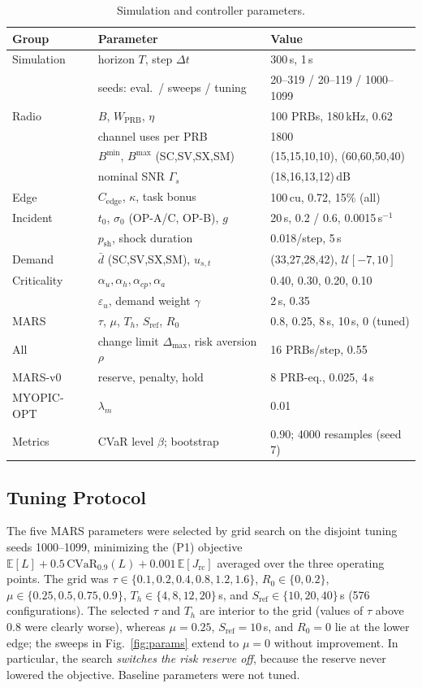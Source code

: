 \documentclass[conference]{IEEEtran}
\newcommand{\figref}[1]{Fig.~\ref{#1}}
\begin{document}
\begin{table}[t]
\centering
\caption{Simulation and controller parameters.}
\label{tab:params}
\scriptsize
\setlength{\tabcolsep}{2.5pt}
\begin{tabular}{lll}
\toprule
Group & Parameter & Value\\
\midrule
Simulation & horizon $T$, step $\Delta t$ & 300\,s, 1\,s\\
 & seeds: eval.\ / sweeps / tuning & 20--319 / 20--119 / 1000--1099\\
Radio & $B$, $W_{\mathrm{PRB}}$, $\eta$ & 100 PRBs, 180\,kHz, 0.62\\
 & channel uses per PRB & 1800\\
 & $B^{\min}$, $B^{\max}$ (SC,SV,SX,SM) & (15,15,10,10), (60,60,50,40)\\
 & nominal SNR $\Gamma_s$ & (18,16,13,12)\,dB\\
Edge & $C_{\mathrm{edge}}$, $\kappa$, task bonus & 100\,cu, 0.72, 15\% (all)\\
Incident & $t_0$, $\sigma_0$ (OP-A/C, OP-B), $g$ & 20\,s, 0.2 / 0.6, 0.0015\,s$^{-1}$\\
 & $p_{\mathrm{sh}}$, shock duration & 0.018/step, 5\,s\\
Demand & $\bar d$ (SC,SV,SX,SM), $u_{s,t}$ & (33,27,28,42), $\mathcal{U}[-7,10]$\\
Criticality & $\alpha_u,\alpha_h,\alpha_{cp},\alpha_a$ & 0.40, 0.30, 0.20, 0.10\\
 & $\varepsilon_u$, demand weight $\gamma$ & 2\,s, 0.35\\
MARS & $\tau$, $\mu$, $T_h$, $S_{\mathrm{ref}}$, $R_0$ & 0.8, 0.25, 8\,s, 10\,s, 0 (tuned)\\
All & change limit $\Delta_{\max}$, risk aversion $\rho$ & 16 PRBs/step, 0.55\\
MARS-v0 & reserve, penalty, hold & 8 PRB-eq., 0.025, 4\,s\\
MYOPIC-OPT & $\lambda_m$ & 0.01\\
Metrics & CVaR level $\beta$; bootstrap & 0.90; 4000 resamples (seed 7)\\
\bottomrule
\end{tabular}
\end{table}

\subsection{Tuning Protocol}
The five MARS parameters were selected by grid search on the disjoint tuning seeds 1000--1099, minimizing the (P1) objective $\mathbb{E}[L]+0.5\,\mathrm{CVaR}_{0.9}(L)+0.001\,\mathbb{E}[J_{\mathrm{rc}}]$ averaged over the three operating points. The grid was $\tau\in\{0.1,0.2,0.4,0.8,1.2,1.6\}$, $R_0\in\{0,0.2\}$, $\mu\in\{0.25,0.5,0.75,0.9\}$, $T_h\in\{4,8,12,20\}$\,s, and $S_{\mathrm{ref}}\in\{10,20,40\}$\,s (576 configurations). The selected $\tau$ and $T_h$ are interior to the grid (values of $\tau$ above 0.8 were clearly worse), whereas $\mu=0.25$, $S_{\mathrm{ref}}=10$\,s, and $R_0=0$ lie at the lower edge; the sweeps in \figref{fig:params} extend to $\mu=0$ without improvement. In particular, the search \emph{switches the risk reserve off}, because the reserve never lowered the objective. Baseline parameters were not tuned.
\end{document}
